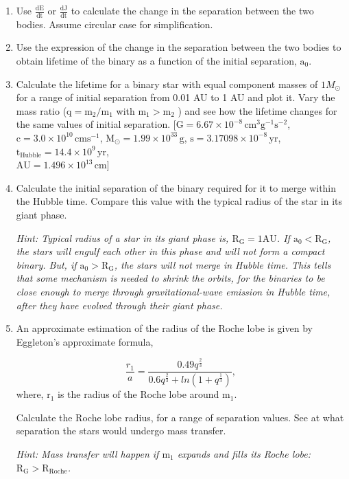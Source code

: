 \documentclass{article} %
\begin{document}
     \begin{enumerate}
     \item Use $\mathrm{\frac{dE}{dt}}$ or $\mathrm{\frac{dJ}{dt}}$ to calculate the change in the separation between the two bodies. Assume circular case for simplification.
     \item Use the expression of the change in the separation between the two bodies to obtain lifetime of the binary as a function of the initial separation, $\mathrm{a_0}$.
     \item Calculate the lifetime for a binary star with equal component masses of $1 M_{\odot}$ for a range of initial separation from 0.01 AU to 1 AU and plot it. Vary the mass ratio ($\mathrm{q=m_2/m_1}$ with $\mathrm{m_1 > m_2}$ ) and see how the lifetime changes for the same values of initial separation.
    [$\mathrm{G = 6.67\times10^{-8}\,cm^3g^{-1}s^{-2}}$, $\mathrm{c = 3.0\times10^{10}\,cm s^{-1}}$,
    $\mathrm{M_{\odot} = 1.99\times10^{33}\,g}$, $\mathrm{s = 3.17098\times10^{-8}\,yr}$, 
    $\mathrm{t_{Hubble} = 14.4\times10^9\,yr}$, \\
    $\mathrm{AU = 1.496\times10^{13}\,cm}$]
    
    \item Calculate the initial separation of the binary required for it to merge within the Hubble time. Compare this value with the typical radius of the star in its giant phase.
    
    \textit{Hint: Typical radius of a star in its giant phase is, $\mathrm{R_G = 1 AU}$. If $\mathrm{a_0 < R_G}$, the stars will engulf each other in this phase and will not form a compact binary. But, if $\mathrm{a_0 > R_G}$, the stars will not merge in Hubble time. This tells that some mechanism is needed to shrink the orbits, for the binaries to be close enough to merge through gravitational-wave emission in Hubble time, after they have evolved through their giant phase.}
    
    \item An approximate estimation of the radius of the Roche lobe is given by Eggleton’s approximate formula,
    
    \begin{equation}
    \frac{r_1}{a} = \frac{0.49 q^{\frac{2}{3}}}{0.6 q^{\frac{2}{3}}+ ln(1+q^{\frac{1}{3}})},
    \end{equation}
    where, $\mathrm{r_1}$ is the radius of the Roche lobe around $\mathrm{m_1}$.
    
    Calculate the Roche lobe radius, for a range of separation values. See at what separation the stars would undergo mass transfer.
    
    \textit{Hint: Mass transfer will happen if $\mathrm{m_1}$ expands and fills its Roche lobe: $\mathrm{R_G>R_{Roche}}$.}
    
    \end{enumerate}
    
\end{document}
